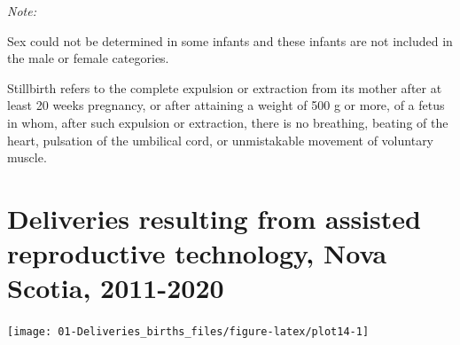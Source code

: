 \documentclass[
]{krantz}
\begin{document}
\begin{table}[H]
{\begin{threeparttable}
\begin{tabular}[t]{lrrrrrrrrrr}
\bottomrule
\end{tabular}
\begin{tablenotes}
\item \textit{Note: } 
\item Sex could not be determined in some infants and these infants are not included in the male or female categories.
\item Stillbirth refers to the complete expulsion or extraction from its mother after at least 20 weeks pregnancy, or after attaining a weight of 500 g or more, of a fetus in whom, after such expulsion or extraction, there is no breathing, beating of the heart, pulsation of the umbilical cord, or unmistakable movement of voluntary muscle.
\end{tablenotes}
\end{threeparttable}}
\end{table}

\hypertarget{section-14}{%
\section{Deliveries resulting from assisted reproductive technology, Nova Scotia, 2011-2020}\label{section-14}}

\begin{center}\texttt{[image: 01-Deliveries\_births\_files/figure-latex/plot14-1]} \end{center}

\begin{table}[H]
\centering
{}
\end{table}
\end{document}
